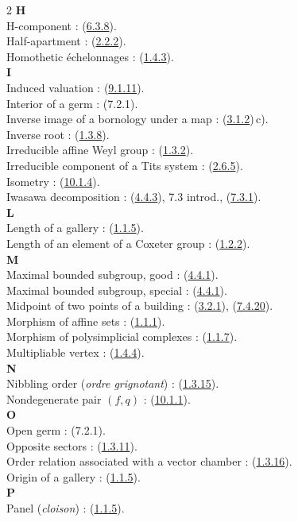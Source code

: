 \documentclass[12pt,a4paper,oneside,english]{smfart}
\newcommand{\btref}[1]{\hyperlink{bt:#1}{#1}}
\theoremstyle{definition}
\theoremstyle{bt}
\begin{document}
\begin{multicols}{2}
\textbf{H}\\
H-component : (\btref{6.3.8}).\\
Half-apartment : (\btref{2.2.2}).\\
Homothetic échelonnages : (\btref{1.4.3}).\\
\textbf{I}\\
Induced valuation : (\btref{9.1.11}).\\
Interior of a germ : (7.2.1).\\
Inverse image of a bornology under a map : (\btref{3.1.2})\,c).\\
Inverse root : (\btref{1.3.8}).\\
Irreducible affine Weyl group : (\btref{1.3.2}).\\
Irreducible component of a Tits system : (\btref{2.6.5}).\\
Isometry : (\btref{10.1.4}).\\
Iwasawa decomposition : (\btref{4.4.3}), 7.3 introd., (\btref{7.3.1}).\\
\textbf{L}\\
Length of a gallery : (\btref{1.1.5}).\\
Length of an element of a Coxeter group : (\btref{1.2.2}).\\
\textbf{M}\\
Maximal bounded subgroup, good : (\btref{4.4.1}).\\
Maximal bounded subgroup, special : (\btref{4.4.1}).\\
Midpoint of two points of a building : (\btref{3.2.1}), (\btref{7.4.20}).\\
Morphism of affine sets : (\btref{1.1.1}).\\
Morphism of polysimplicial complexes : (\btref{1.1.7}).\\
Multipliable vertex : (\btref{1.4.4}).\\
\textbf{N}\\
Nibbling order (\emph{ordre grignotant}) : (\btref{1.3.15}).\\
Nondegenerate pair $(f,q)$ : (\btref{10.1.1}).\\
\textbf{O}\\
Open germ : (7.2.1).\\
Opposite sectors : (\btref{1.3.11}).\\
Order relation associated with a vector chamber : (\btref{1.3.16}).\\
Origin of a gallery : (\btref{1.1.5}).\\
\textbf{P}\\
Panel (\emph{cloison}) : (\btref{1.1.5}).\\

\end{multicols}
\end{document}
